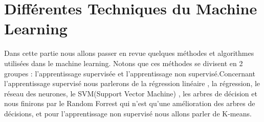 \section{{ Différentes Techniques du Machine Learning   \cite{AndNgCourse}	} } 
Dans cette partie nous allons passer en revue quelques méthodes et algorithmes utilisées dans le machine learning.
Notons que ces méthodes se divisent en 2 groupes : l'apprentissage supervisée et l'apprentissage non supervisé.Concernant l'apprentissage supervisé nous parlerons de la régression linéaire , la régression, le réseau des neurones, le SVM(Support Vector Machine) , les arbres de décision et nous finirons par le Random Forrest qui n'est qu'une amélioration des arbres de décisions, et pour l'apprentissage non supervisé nous allons parler de K-means.  